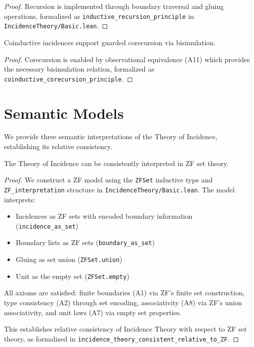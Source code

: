 \documentclass{article}
\begin{document}
\begin{proof}
Recursion is implemented through boundary traversal and gluing operations, formalized as \texttt{inductive\_recursion\_principle} in \texttt{IncidenceTheory/Basic.lean}.
\end{proof}

\begin{theorem}
\label{thm:coinductive-corecursion}
Coinductive incidences support guarded corecursion via bisimulation.
\end{theorem}

\begin{proof}
Corecursion is enabled by observational equivalence (A11) which provides the necessary bisimulation relation, formalized as \texttt{coinductive\_corecursion\_principle}.
\end{proof}

\section{Semantic Models}

We provide three semantic interpretations of the Theory of Incidence, establishing its relative consistency.

\begin{theorem}
\label{thm:zf-model}
The Theory of Incidence can be consistently interpreted in ZF set theory.
\end{theorem}

\begin{proof}
We construct a ZF model using the \texttt{ZFSet} inductive type and \texttt{ZF\_interpretation} structure in \texttt{IncidenceTheory/Basic.lean}. The model interprets:
\begin{itemize}
\item Incidences as ZF sets with encoded boundary information (\texttt{incidence\_as\_set})
\item Boundary lists as ZF sets (\texttt{boundary\_as\_set})
\item Gluing as set union (\texttt{ZFSet.union})
\item Unit as the empty set (\texttt{ZFSet.empty})
\end{itemize}

All axioms are satisfied: finite boundaries (A1) via ZF's finite set construction, type consistency (A2) through set encoding, associativity (A8) via ZF's union associativity, and unit laws (A7) via empty set properties.

This establishes relative consistency of Incidence Theory with respect to ZF set theory, as formalized in \texttt{incidence\_theory\_consistent\_relative\_to\_ZF}.
\end{proof}
\end{document}
